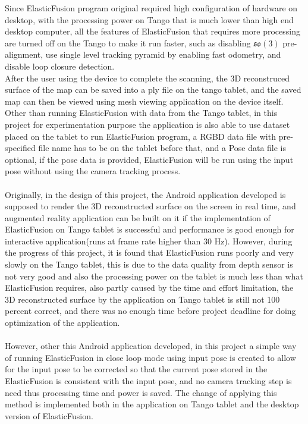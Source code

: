 \documentclass[12pt,twoside]{article}
\begin{document}
Since ElasticFusion program original required high configuration of hardware on desktop, with the processing power on Tango that is much lower than high end desktop computer, all the features of ElasticFusion that requires more processing are turned off on the Tango to make it run faster, such as disabling $\mathfrak{so}(3)$ pre-alignment, use single level tracking pyramid by enabling fast odometry, and disable loop closure detection.\\
After the user using the device to complete the scanning, the 3D reconstruced surface of the map can be saved into a ply file on the tango tablet, and the saved map can then be viewed using mesh viewing application on the device itself.\\
Other than running ElasticFusion with data from the Tango tablet, in this project for experimentation purpose the application is also able to use dataset placed on the tablet to run ElasticFusion program, a RGBD data file with pre-specified file name has to be on the tablet before that, and a Pose data file is optional, if the pose data is provided, ElasticFusion will be run using the input pose without using the camera tracking process.\\
\\
Originally, in the design of this project, the Android application developed is supposed to render the 3D reconstructed surface on the screen in real time, and augmented reality application can be built on it if the implementation of ElasticFusion on Tango tablet is successful and performance is good enough for interactive application(runs at frame rate higher than 30 Hz). However, during the progress of this project, it is found that ElasticFusion runs poorly and very slowly on the Tango tablet, this is due to the data quality from depth sensor
is not very good and also the processing power on the tablet is much less than what ElasticFusion requires, also partly caused by the time and effort limitation, the 3D reconstructed surface by the application on Tango tablet is still not 100 percent correct, and there was no enough time before project deadline for doing optimization of the application.\\
\\
However, other this Android application developed, in this project a simple way of running ElasticFusion in close loop mode using input pose is created to allow for the input pose to be corrected so that the current pose stored in the ElasticFusion is consistent with the input pose, and no camera tracking step is need thus processing time and power is saved. The change of applying this method is implemented both in the application on Tango tablet and the desktop version of ElasticFusion.\\
\end{document}
